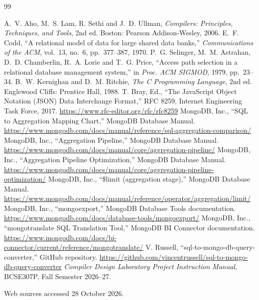 \documentclass[12pt,a4paper]{report}
\begin{document}
\renewcommand{\bibname}{References}
\begin{thebibliography}{99}
 A.~V. Aho, M.~S. Lam, R. Sethi and J.~D. Ullman, \textit{Compilers: Principles, Techniques, and Tools}, 2nd ed. Boston: Pearson Addison-Wesley, 2006.
 E.~F. Codd, ``A relational model of data for large shared data banks,'' \textit{Communications of the ACM}, vol.~13, no.~6, pp.~377--387, 1970.
 P.~G. Selinger, M.~M. Astrahan, D.~D. Chamberlin, R.~A. Lorie and T.~G. Price, ``Access path selection in a relational database management system,'' in \textit{Proc. ACM SIGMOD}, 1979, pp.~23--34.
 B.~W. Kernighan and D.~M. Ritchie, \textit{The C Programming Language}, 2nd ed. Englewood Cliffs: Prentice Hall, 1988.
 T. Bray, Ed., ``The JavaScript Object Notation (JSON) Data Interchange Format,'' RFC 8259, Internet Engineering Task Force, 2017. \url{https://www.rfc-editor.org/rfc/rfc8259}
 MongoDB, Inc., ``SQL to Aggregation Mapping Chart,'' MongoDB Database Manual. \url{https://www.mongodb.com/docs/manual/reference/sql-aggregation-comparison/}
 MongoDB, Inc., ``Aggregation Pipeline,'' MongoDB Database Manual. \url{https://www.mongodb.com/docs/manual/core/aggregation-pipeline/}
 MongoDB, Inc., ``Aggregation Pipeline Optimization,'' MongoDB Database Manual. \url{https://www.mongodb.com/docs/manual/core/aggregation-pipeline-optimization/}
 MongoDB, Inc., ``\$limit (aggregation stage),'' MongoDB Database Manual. \url{https://www.mongodb.com/docs/manual/reference/operator/aggregation/limit/}
 MongoDB, Inc., ``mongoexport,'' MongoDB Database Tools documentation. \url{https://www.mongodb.com/docs/database-tools/mongoexport/}
 MongoDB, Inc., ``mongotranslate SQL Translation Tool,'' MongoDB BI Connector documentation. \url{https://www.mongodb.com/docs/bi-connector/current/reference/mongotranslate/}
 V. Russell, ``sql-to-mongo-db-query-converter,'' GitHub repository. \url{https://github.com/vincentrussell/sql-to-mongo-db-query-converter}
 \textit{Compiler Design Laboratory Project Instruction Manual}, BCSE307P, Fall Semester 2026--27.
\item[] Web sources accessed 28 October 2026.
\end{thebibliography}
\end{document}
